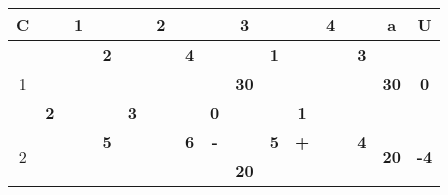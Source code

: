 \documentclass[a4paper, 12pt]{article}
\begin{document}
\begin{table}[H]
  \centering
    \begin{tabular}{|c|cccc|cccc|cccc|cccc|rr|}
    \hline
    C     & \multicolumn{4}{c|}{1}        & \multicolumn{4}{c|}{2}        & \multicolumn{4}{c|}{3}        & \multicolumn{4}{c|}{4}        & \multicolumn{1}{c|}{a} & \multicolumn{1}{c|}{U} \bigstrut\\
    \hline
    \multirow{4}[6]{*}{1} &       &       & \multicolumn{1}{r|}{} & \textbf{2} &       &       & \multicolumn{1}{r|}{} & \textbf{4} &       &       & \multicolumn{1}{r|}{} & \cellcolor[rgb]{ 1,  .753,  0}\textbf{1} &       &       & \multicolumn{1}{r|}{} & \textbf{3} & \multicolumn{1}{c|}{\multirow{4}[6]{*}{\textbf{30}}} & \multicolumn{1}{c|}{\multirow{4}[6]{*}{\textbf{0}}} \bigstrut\\
\cline{5-5}\cline{9-9}\cline{13-13}\cline{17-17}          &       & \multicolumn{2}{c}{\multirow{2}[2]{*}{}} &       &       & \multicolumn{2}{c}{\multirow{2}[2]{*}{}} &       &       & \multicolumn{2}{c}{\multirow{2}[2]{*}{\textbf{30}}} &       &       & \multicolumn{2}{c}{\multirow{2}[2]{*}{}} &       & \multicolumn{1}{c|}{} &  \bigstrut[t]\\
          &       & \multicolumn{2}{c}{} &       &       & \multicolumn{2}{c}{} &       &       & \multicolumn{2}{c}{} &       &       & \multicolumn{2}{c}{} &       & \multicolumn{1}{c|}{} &  \bigstrut[b]\\
\cline{2-2}\cline{6-6}\cline{10-10}\cline{14-14}          & \multicolumn{1}{c|}{\textbf{2}} & \multicolumn{2}{c}{} &       & \multicolumn{1}{c|}{\textbf{3}} & \multicolumn{2}{c}{} &       & \multicolumn{1}{c|}{\textbf{0}} & \multicolumn{2}{c}{} &       & \multicolumn{1}{c|}{\textbf{1}} & \multicolumn{2}{c}{} &       & \multicolumn{1}{c|}{} &  \bigstrut\\
    \hline
    \multirow{4}[6]{*}{2} &       &       & \multicolumn{1}{r|}{} & \textbf{5} &       &       & \multicolumn{1}{r|}{} & \textbf{6} & \multicolumn{1}{c|}{\cellcolor[rgb]{ 1,  0,  0}\textbf{-}} &       & \multicolumn{1}{r|}{} & \cellcolor[rgb]{ 1,  1,  0}\textbf{5} & \multicolumn{1}{c|}{\cellcolor[rgb]{ 1,  0,  0}\textbf{+}} &       & \multicolumn{1}{r|}{} & \cellcolor[rgb]{ 0,  .69,  .314}\textbf{4} & \multicolumn{1}{c|}{\multirow{4}[6]{*}{\textbf{20}}} & \multicolumn{1}{c|}{\multirow{4}[6]{*}{\textbf{-4}}} \bigstrut\\
\cline{5-5}\cline{9-10}\cline{13-14}\cline{17-17}          &       & \multicolumn{2}{c}{\multirow{2}[2]{*}{}} &       &       & \multicolumn{2}{c}{\multirow{2}[2]{*}{}} &       &       & \multicolumn{2}{c}{\multirow{2}[2]{*}{\textbf{20}}} & \multirow{3}[4]{*}{} &       & \multicolumn{2}{c}{\multirow{2}[2]{*}{}} &       & \multicolumn{1}{c|}{} &  \bigstrut[t]\\

\end{tabular}
\end{table}
\end{document}
